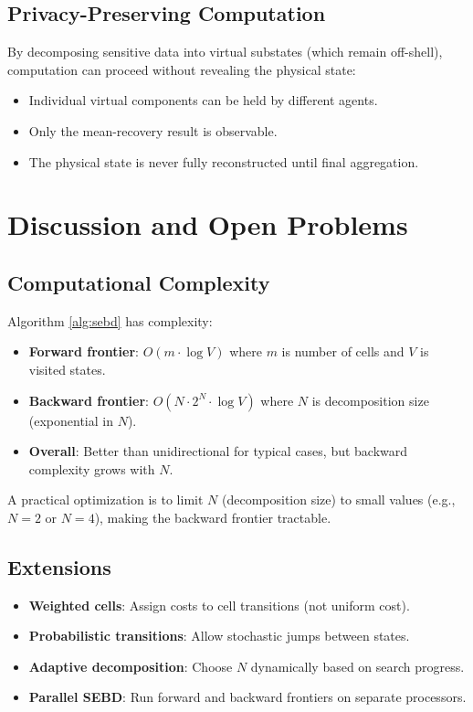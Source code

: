 \documentclass[twocolumn,11pt,a4paper]{article}
\begin{document}
\subsection{Privacy-Preserving Computation}

By decomposing sensitive data into virtual substates (which remain off-shell), computation can proceed without revealing the physical state:
\begin{itemize}[nosep,leftmargin=1em]
  \item Individual virtual components can be held by different agents.
  \item Only the mean-recovery result is observable.
  \item The physical state is never fully reconstructed until final aggregation.
\end{itemize}

\section{Discussion and Open Problems}
\label{sec:discussion}

\subsection{Computational Complexity}

Algorithm \ref{alg:sebd} has complexity:
\begin{itemize}[nosep,leftmargin=1em]
  \item \textbf{Forward frontier}: $O(m \cdot \log V)$ where $m$ is number of cells and $V$ is visited states.
  \item \textbf{Backward frontier}: $O(N \cdot 2^N \cdot \log V)$ where $N$ is decomposition size (exponential in $N$).
  \item \textbf{Overall}: Better than unidirectional for typical cases, but backward complexity grows with $N$.
\end{itemize}

A practical optimization is to limit $N$ (decomposition size) to small values (e.g., $N = 2$ or $N = 4$), making the backward frontier tractable.

\subsection{Extensions}

\begin{itemize}[nosep,leftmargin=1em]
  \item \textbf{Weighted cells}: Assign costs to cell transitions (not uniform cost).
  \item \textbf{Probabilistic transitions}: Allow stochastic jumps between states.
  \item \textbf{Adaptive decomposition}: Choose $N$ dynamically based on search progress.
  \item \textbf{Parallel SEBD}: Run forward and backward frontiers on separate processors.
\end{itemize}
\end{document}
